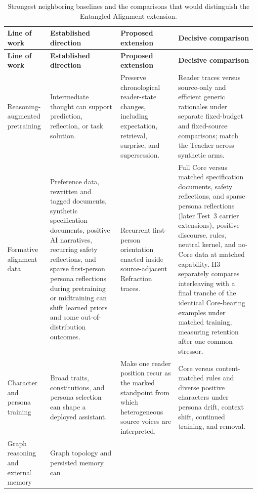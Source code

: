 \documentclass[11pt]{article}
\begin{document}
\begingroup
\footnotesize
\setlength{\tabcolsep}{3pt}
\begin{longtable}{
  >{\raggedright\arraybackslash}p{2.8cm}
  >{\raggedright\arraybackslash}p{3.7cm}
  >{\raggedright\arraybackslash}p{4.0cm}
  >{\raggedright\arraybackslash}p{4.3cm}}
\caption{Strongest neighboring baselines and the comparisons that would
distinguish the Entangled Alignment extension.}
\label{tab:decisive-comparisons}\\
\toprule
\textbf{Line of work} & \textbf{Established direction} & \textbf{Proposed extension} & \textbf{Decisive comparison} \\
\midrule
\endfirsthead
\toprule
\textbf{Line of work} & \textbf{Established direction} & \textbf{Proposed extension} & \textbf{Decisive comparison} \\
\midrule
\endhead
\bottomrule
\endlastfoot
Reasoning-augmented pretraining & Intermediate thought can support prediction,
reflection, or task solution. & Preserve chronological reader-state changes,
including expectation, retrieval, surprise, and supersession. & Reader traces
versus source-only and efficient generic rationales under separate fixed-budget
and fixed-source comparisons; match the Teacher across synthetic arms. \\
\addlinespace
Formative alignment data & Preference data, rewritten and tagged documents,
synthetic specification documents, positive AI narratives, recurring safety
reflections, and sparse first-person persona reflections during pretraining or
midtraining can shift learned priors and some out-of-distribution outcomes. & Recurrent first-person orientation
enacted inside source-adjacent Refraction traces. & Full Core versus matched
specification documents, safety reflections, and sparse persona reflections
(later Test~3 carrier extensions), positive discourse, rules,
neutral kernel, and no-Core data at matched capability. H3 separately compares
interleaving with a final tranche of the identical Core-bearing examples under
matched training, measuring retention after one common stressor. \\
\addlinespace
Character and persona training & Broad traits, constitutions, and persona
selection can shape a deployed assistant. & Make one reader position recur as
the marked standpoint from which heterogeneous source voices are interpreted.
& Core versus content-matched rules and diverse positive characters under
persona drift, context shift, continued training, and removal. \\
\addlinespace
Graph reasoning and external memory & Graph topology and persisted memory can

\end{longtable}
\end{document}
